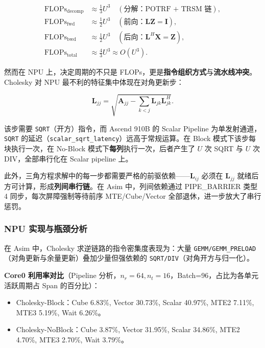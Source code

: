 \documentclass{CjC}
\begin{document}
    \begin{equation}
        \begin{aligned}
            \text{FLOPs}_{\text{decomp}} & \approx \frac{1}{3}U^{3}\quad (\text{分解：POTRF + TRSM 链}),            \\
            \text{FLOPs}_{\text{fwd}}    & \approx \frac{1}{2}U^{3}\quad (\text{前向：$\bm{LZ}=\bm{I}$}),          \\
            \text{FLOPs}_{\text{bwd}}    & \approx \frac{1}{2}U^{3}\quad (\text{后向：$\bm{L}^{H}\bm{X}=\bm{Z}$}), \\
            \text{FLOPs}_{\text{total}}  & \approx \frac{4}{3}U^{3}\approx O(U^{3}).
        \end{aligned}
    \end{equation}

    然而在 NPU 上，决定周期的不只是 FLOPs，更是\textbf{指令组织方式}与\textbf{流水线冲突}。Cholesky
    对 NPU 最不利的特征集中体现在对角更新步：

    \begin{equation}
        \boxed{\bm{L}_{jj} = \sqrt{\bm{A}_{jj}- \sum_{k<j}\bm{L}_{jk}\bm{L}_{jk}^{H}}}
        .
    \end{equation}

    该步需要 \texttt{SQRT}（开方）指令，而 Ascend 910B 的 Scalar Pipeline 为单发射通道，\texttt{SQRT}
    的延迟（\texttt{scalar\_sqrt\_latency}）远高于常规运算。在 Block
    模式下该步每块执行一次，在 No-Block 模式下\textbf{每列}执行一次，后者产生了 $U$
    次 SQRT 与 $U$ 次 DIV，全部串行化在 Scalar pipeline 上。

    此外，三角方程求解中的每一步都需要严格的前驱依赖——$\bm{L}_{ij}$ 必须在 $\bm{L}
    _{jj}$ 就绪后方可计算，形成\textbf{列间串行链}。在 Asim 中，列间依赖通过
    PIPE\_BARRIER 类型 4 同步，每次屏障强制等待前序 MTE/Cube/Vector
    全部退休，进一步放大了串行惩罚。

    \subsubsection{NPU 实现与瓶颈分析}

    在 Asim 中，Cholesky 求逆链路的指令密集度表现为：大量 \texttt{GEMM/GEMM\_PRELOAD}（对角更新与余量更新）叠加少量但强依赖的
    \texttt{SQRT/DIV}（对角开方与归一化）。

    \textbf{Core0 利用率对比}（Pipeline 分析，$n_{r}=64,n_{t}=16$，Batch=96，占比为各单元活跃周期占
    Span 的百分比）：
    \begin{itemize}
        \item Cholesky-Block：Cube 6.83\%, Vector 30.73\%, Scalar 40.97\%, MTE2 7.11\%,
            MTE3 5.19\%, Wait 6.26\%。

        \item Cholesky-NoBlock：Cube 3.87\%, Vector 31.95\%, Scalar 34.86\%, MTE2
            4.70\%, MTE3 2.70\%, Wait 3.79\%。
    \end{itemize}
\end{document}
